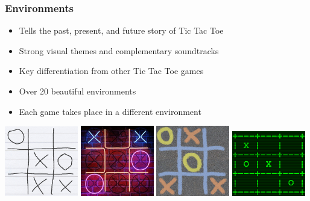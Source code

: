 \documentclass{beamer}
\begin{document}
\begin{frame}
  \frametitle{Environments}

  \begin{itemize}
    \item Tells the past, present, and future story of Tic Tac Toe
    \item Strong visual themes and complementary soundtracks
    \item Key differentiation from other Tic Tac Toe games
    \item Over 20 beautiful environments
    \item Each game takes place in a different environment
  \end{itemize}

  \begin{center}
    \vspace{1em}
    \includegraphics[width=0.24\textwidth]{img/concept-art/paper}
    \includegraphics[width=0.24\textwidth]{img/concept-art/neon}
    \includegraphics[width=0.24\textwidth]{img/concept-art/sidewalk}
    \includegraphics[width=0.24\textwidth]{img/concept-art/computer}
  \end{center}

\end{frame}
\end{document}
